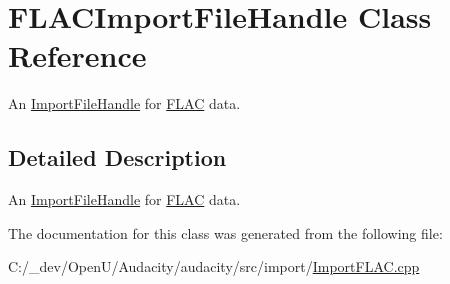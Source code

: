 \hypertarget{class_f_l_a_c_import_file_handle}{}\section{F\+L\+A\+C\+Import\+File\+Handle Class Reference}
\label{class_f_l_a_c_import_file_handle}


An \hyperlink{class_import_file_handle}{Import\+File\+Handle} for \hyperlink{namespace_f_l_a_c}{F\+L\+AC} data.  




\subsection{Detailed Description}
An \hyperlink{class_import_file_handle}{Import\+File\+Handle} for \hyperlink{namespace_f_l_a_c}{F\+L\+AC} data. 

The documentation for this class was generated from the following file\+:\begin{DoxyCompactItemize}
\item 
C\+:/\+\_\+dev/\+Open\+U/\+Audacity/audacity/src/import/\hyperlink{_import_f_l_a_c_8cpp}{Import\+F\+L\+A\+C.\+cpp}\end{DoxyCompactItemize}
